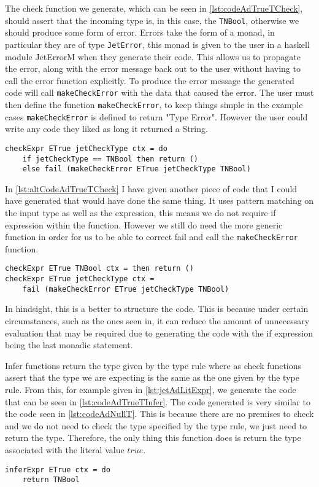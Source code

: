 The check function we generate, which can be seen in \autoref{lst:codeAdTrueTCheck}, should assert that the incoming type is, in this case, the \texttt{TNBool}, otherwise we should produce some form of error.
Errors take the form of a monad, in particular they are of type \texttt{JetError}, this monad is given to the user in a haskell module JetErrorM when they generate their code.
This allows us to propagate the error, along with the error message back out to the user without having to call the error function explicitly.
To produce the error message the generated code will call \texttt{makeCheckError} with the data that caused the error.
The user must then define the function \texttt{makeCheckError}, to keep things simple in the example cases \texttt{makeCheckError} is defined to return "Type Error".
However the user could write any code they liked as long it returned a String.

\begin{lstlisting}[caption = Code generated for checkExpr from AdTrueT, label=lst:codeAdTrueTCheck]
checkExpr ETrue jetCheckType ctx = do
    if jetCheckType == TNBool then return () 
    else fail (makeCheckError ETrue jetCheckType TNBool)
\end{lstlisting}

In \autoref{lst:altCodeAdTrueTCheck} I have given another piece of code that I could have generated that would have done the same thing.
It uses pattern matching on the input type as well as the expression, this means we do not require if expression within the function.
However we still do need the more generic function in order for us to be able to correct fail and call the \texttt{makeCheckError} function.

\begin{lstlisting}[caption = Alternate Code for checkExpr from AdTrueT, label=lst:altCodeAdTrueTCheck]
checkExpr ETrue TNBool ctx = then return () 
checkExpr ETrue jetCheckType ctx = 
    fail (makeCheckError ETrue jetCheckType TNBool)
\end{lstlisting}

In hindsight, this is a better to structure the code.
This is because under certain circumstances, such as the ones seen in, it can reduce the amount of unnecessary evaluation that may be required due to generating the code with the if expression being the last monadic statement.

Infer functions return the type given by the type rule where as check functions assert that the type we are expecting is the same as the one given by the type rule.
From this, for example given in \autoref{lst:jetAdLitExpr}, we generate the code that can be seen in \autoref{lst:codeAdTrueTInfer}.
The code generated is very similar to the code seen in \autoref{lst:codeAdNullT}.
This is because there are no premises to check and we do not need to check the type specified by the type rule, we just need to return the type.
Therefore, the only thing this function does is return the type associated with the literal value $true$.

\begin{lstlisting}[caption = Code generated for inferExpr from AdTrueT, label=lst:codeAdTrueTInfer]
inferExpr ETrue ctx = do
    return TNBool
\end{lstlisting}